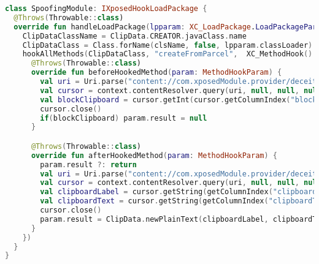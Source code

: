 \begin{landscape} 
\begin{lstlisting}[caption={Kotlin code to deceive Clipboard data with the data defined by user in \textit{Deceit} policies.},label={lst:clipboardDeceiver},language=Kotlin,float=*]
class SpoofingModule: IXposedHookLoadPackage {
  @Throws(Throwable::class)
  override fun handleLoadPackage(lpparam: XC_LoadPackage.LoadPackageParam) {
    ClipDataClassName = ClipData.CREATOR.javaClass.name
    ClipDataClass = Class.forName(clsName, false, lpparam.classLoader)
    hookAllMethods(ClipDataClass, "createFromParcel",  XC_MethodHook() {
      @Throws(Throwable::class)
      override fun beforeHookedMethod(param: MethodHookParam) {
        val uri = Uri.parse("content://com.xposedModule.provider/deceitSettings")
        val cursor = context.contentResolver.query(uri, null, null, null, null) ?: return
        val blockClipboard = cursor.getInt(cursor.getColumnIndex("blockClipboard"))
        cursor.close()
        if(blockClipboard) param.result = null
      }

      @Throws(Throwable::class)
      override fun afterHookedMethod(param: MethodHookParam) {
        param.result ?: return
        val uri = Uri.parse("content://com.xposedModule.provider/deceits")
        val cursor = context.contentResolver.query(uri, null, null, null, null) ?: return
        val clipboardLabel = cursor.getString(getColumnIndex("clipboardLabel")) ?: "dummyLabel"
        val clipboardText = cursor.getString(getColumnIndex("clipboardText")) ?: "dummyText"  
        cursor.close()
        param.result = ClipData.newPlainText(clipboardLabel, clipboardText)
      }       
    })   
  }
}
\end{lstlisting}
\end{landscape} 